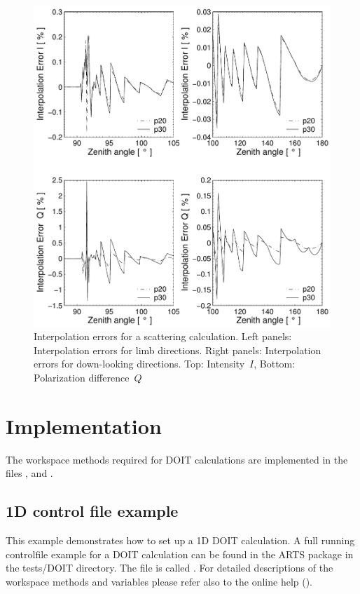 \begin{figure}[htbp]
  \centering
  \includegraphics[width=.9\hsize]{interp_err}
  \caption{Interpolation errors for a scattering calculation.
    Left panels: Interpolation errors for limb directions.
    Right panels: Interpolation errors for down-looking directions.
    Top: Intensity~$I$, Bottom: Polarization difference~$Q$}
  \label{fig:scattering:interp_err}  
\end{figure}

\section{Implementation}

The workspace methods required for DOIT calculations are implemented
in the files ,  and
. 

\subsection{1D control file example}
This example demonstrates how to set up a 1D DOIT calculation. A full
running controlfile example for a DOIT calculation can be found in the
ARTS package in the tests/DOIT directory. The file is called
. For detailed descriptions of the
workspace methods and variables please refer also to the online help
().
 
